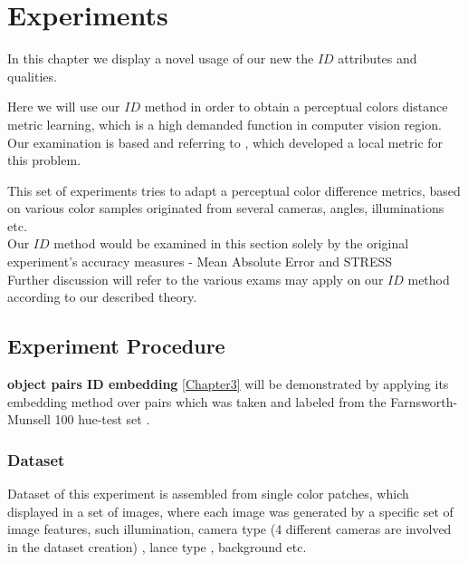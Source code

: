 
\chapter{Experiments} %

\label{Chapter8}

In this chapter we display a novel usage of our new the $ID$ attributes and qualities.

Here we will use our $ID$ method in order to obtain a perceptual colors distance metric learning, which is a high demanded function in computer vision region. Our examination is based and referring to \cite{perp_color}, which developed a local metric for this problem. 

This set of experiments tries to adapt a perceptual color difference metrics, based on various color samples originated from several cameras, angles, illuminations etc.
\\

Our $ID$ method would be examined in this section solely by the original experiment's accuracy measures - Mean Absolute Error \cite{MAE} and STRESS \cite{STRESS}
\\
Further discussion will refer to the various exams may apply on our $ID$ method according to our described theory.

\section{Experiment Procedure}



\textbf{object pairs ID embedding} \ref{Chapter3} will be demonstrated by applying its embedding method over pairs which was taken and labeled from the Farnsworth-Munsell 100 hue-test set \cite{furnsworth}.
\subsection{Dataset}

Dataset of this experiment is assembled from single color patches, which displayed in a set of images, where each image was generated by a specific set of image features, such illumination, camera type (4 different cameras are involved in the dataset creation) , lance type , background etc.

